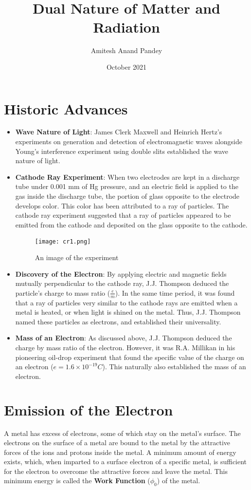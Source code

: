 \documentclass{article}
\title{Dual Nature of Matter and Radiation}
\author{Amitesh Anand Pandey }
\date{October 2021}
\begin{document}
\maketitle
\section{Historic Advances}
\begin{itemize}
    \item \textbf{Wave Nature of Light}: James Clerk Maxwell and Heinrich Hertz's experiments on generation and detection of electromagnetic waves alongside Young's interference experiment using double slits established the wave nature of light.
    \item \textbf{Cathode Ray Experiment}: When two electrodes are kept in a discharge tube under 0.001 mm of Hg pressure, and an electric field is applied to the gas inside the discharge tube, the portion of glass opposite to the electrode develops color. This color has been attributed to a ray of particles. The cathode ray experiment suggested that a ray of particles appeared to be emitted from the cathode and deposited on the glass opposite to the cathode. \\  
    \begin{figure}[htp]
    \centering
    \texttt{[image: cr1.png]}
    \caption{An image of the experiment}
    \label{fig:galaxy}
    \end{figure}
    \item \textbf{Discovery of the Electron}: By applying electric and magnetic fields mutually perpendicular to the cathode ray, J.J. Thompson deduced the particle's charge to mass ratio ($\frac{e}{m}$). In the same time period, it was found that a ray of particles very similar to the cathode rays are emitted when a metal is heated, or when light is shined on the metal. Thus, J.J. Thompson named these particles as electrons, and established their universality. 
    
    \newpage
    
    \item \textbf{Mass of an Electron}: As discussed above, J.J. Thompson deduced the charge by mass ratio of the electron. However, it was R.A. Millikan in his pioneering oil-drop experiment that found the specific value of the charge on an electron ($e = 1.6 \times 10^{-19} C$). This naturally also established the mass of an electron. 
\end{itemize}

\section{Emission of the Electron}
A metal has excess of electrons, some of which stay on the metal's surface. The electrons on the surface of a metal are bound to the metal by the attractive forces of the ions and protons inside the metal. A minimum amount of energy exists, which, when imparted to a surface electron of a specific metal, is sufficient for the electron to overcome the attractive forces and leave the metal. This minimum energy is called the \textbf{Work Function} ($\phi_{0}$) of the metal. \\ 
\end{document}

